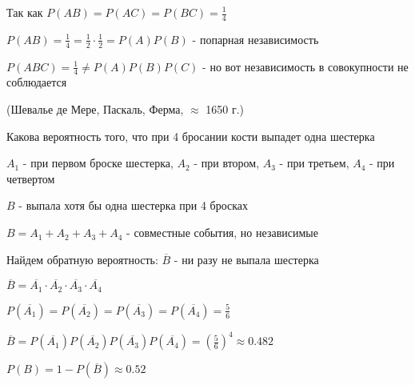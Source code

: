 \documentclass[12pt]{article}
\begin{document}
    Так как $P(AB) = P(AC) = P(BC) = \frac{1}{4}$

    $P(AB) = \frac{1}{4} = \frac{1}{2} \cdot \frac{1}{2} = P(A) P(B)$ - попарная независимость

    $P(ABC) = \frac{1}{4} \neq P(A) P(B) P(C)$ - но вот независимость в совокупности не соблюдается

    \Ex (Шевалье де Мере, Паскаль, Ферма, $\approx$ 1650 г.)

    Какова вероятность того, что при 4 бросании кости выпадет одна шестерка

    $A_1$ - при первом броске шестерка, $A_2$ - при втором, $A_3$ - при третьем, $A_4$ - при четвертом

    $B$ - выпала хотя бы одна шестерка при 4 бросках

    $B = A_1 + A_2 + A_3 + A_4$ - совместные события, но независимые

    Найдем обратную вероятность: $\overline{B}$ - ни разу не выпала шестерка

    $\overline{B} = \overline{A_1} \cdot \overline{A_2} \cdot \overline{A_3} \cdot \overline{A_4}$

    $P(\overline{A_1}) = P(\overline{A_2}) = P(\overline{A_3}) = P(\overline{A_4}) = \frac{5}{6}$

    $\overline{B} = P(\overline{A_1}) P(\overline{A_2}) P(\overline{A_3}) P(\overline{A_4}) = \left(\frac{5}{6}\right)^4 \approx 0.482$

    $P(B) = 1 - P(\overline{B}) \approx 0.52$
\end{document}
